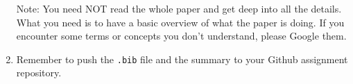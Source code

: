 \documentclass[english]{../TexTemplate/thesis}
\begin{document}
\begin{enumerate}
\bigskip
Note: You need NOT read the whole paper and get deep into all the details.
What you need is to have a basic overview of what the paper is doing.
If you encounter some terms or concepts you don't understand, please Google them.
\item Remember to push the \verb'.bib' file and the summary to your Github assignment repository.
\end{enumerate}
\end{document}
